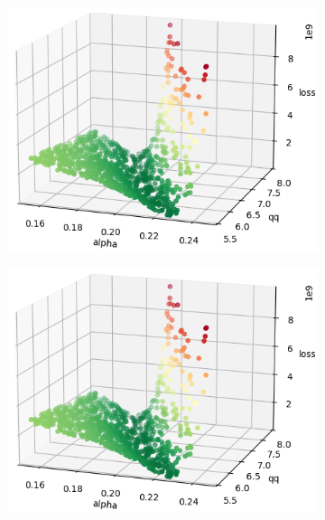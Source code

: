 \begin{figure}[h]
	\centering
	\begin{subfigure}[b]{0.4\textwidth}
		\centering
		\includegraphics[width=\textwidth]{./figures/sensitivity/sensitivity_zoom1_0_2.png}	
	\end{subfigure}
	\begin{subfigure}[b]{0.4\textwidth}
		\centering
		\includegraphics[width=\textwidth]{./figures/sensitivity/sensitivity_zoom1_0_2.png}	
	\end{subfigure}
	\begin{subfigure}[b]{0.4\textwidth}
		\centering

\end{subfigure}
\end{figure}
